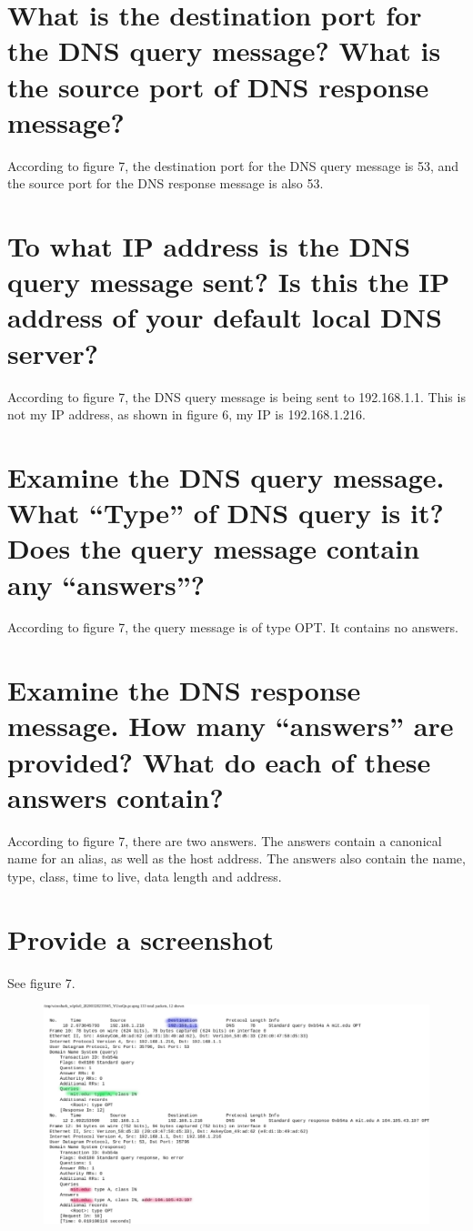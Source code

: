 \documentclass{article}
\begin{document}
\section{What is the destination port for the DNS query message? What is the source port
of DNS response message?}
According to figure 7, the destination port for the DNS query message is 53, and the source port for the DNS response message is also 53.\\

\section{To what IP address is the DNS query message sent? Is this the IP address of your
default local DNS server?}
According to figure 7, the DNS query message is being sent to 192.168.1.1.  This is not my IP address, as shown in figure 6, my IP is 192.168.1.216.\\

\section{Examine the DNS query message. What “Type” of DNS query is it? Does the
query message contain any “answers”?}
According to figure 7, the query message is of type OPT.  It contains no answers.\\

\section{Examine the DNS response message. How many “answers” are provided? What
do each of these answers contain?}
According to figure 7, there are two answers.  The answers contain a canonical name for an alias, as well as the host address.  The answers also contain the name, type, class, time to live, data length and address.\\

\section{Provide a screenshot}
See figure 7.\\

\begin{figure}[h!]
\centering
\includegraphics[scale=0.7]{Q16-19.pdf}
\caption{}
\end{figure}
\end{document}
